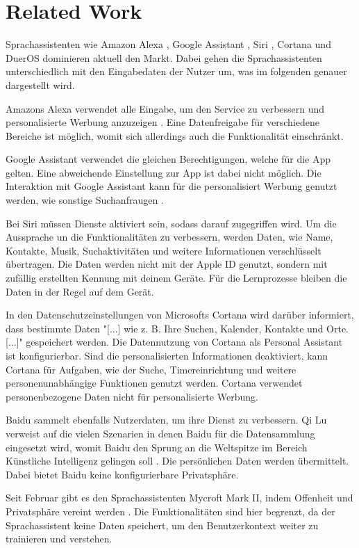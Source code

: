 \section{Related Work}
Sprachassistenten wie Amazon Alexa \cite{alexaAssitent}, Google Assistant \cite{googleAssistant}, Siri \cite{siriAssistent}, Cortana \cite{cortanaAssistent} und DuerOS \cite{baiduAssistant} dominieren aktuell den Markt. Dabei gehen die Sprachassistenten unterschiedlich mit den Eingabedaten der Nutzer um, was im folgenden genauer dargestellt wird. 

Amazons Alexa verwendet alle Eingabe, um den Service zu verbessern und personalisierte Werbung anzuzeigen \cite{alexaPrivacy}. Eine Datenfreigabe für verschiedene Bereiche ist möglich, womit sich allerdings auch die Funktionalität einschränkt. 

Google Assistant verwendet die gleichen Berechtigungen, welche für die App gelten\cite{googleShare}. Eine abweichende Einstellung zur App ist dabei nicht möglich. Die Interaktion mit Google Assistant kann für die personalisiert Werbung genutzt werden, wie sonstige Suchanfraugen \cite{googlePrivacy}. 

Bei Siri müssen Dienste aktiviert sein, sodass darauf zugegriffen wird\cite{siriPrivacy}. Um die Aussprache un die Funktionalitäten zu verbessern, werden Daten, wie Name, Kontakte, Musik, Suchaktivitäten und weitere Informationen verschlüsselt übertragen. Die Daten werden nicht mit der Apple ID genutzt, sondern mit zufällig erstellten Kennung mit deinem Geräte. Für die Lernprozesse bleiben die Daten in der Regel auf dem Gerät.

In den Datenschutzeinstellungen von Microsofts Cortana wird darüber informiert, dass bestimmte Daten "[...] wie z. B. Ihre Suchen, Kalender, Kontakte und Orte. [...]" \cite{cortanaAssistent} gespeichert werden. Die Datennutzung von Cortana als Personal Assistant ist konfigurierbar. Sind die personalisierten Informationen deaktiviert, kann Cortana für Aufgaben, wie der Suche, Timereinrichtung und weitere personenunabhängige Funktionen genutzt werden. Cortana verwendet personenbezogene Daten nicht für personalisierte Werbung.  

Baidu sammelt ebenfalls Nutzerdaten, um ihre Dienst zu verbessern. Qi Lu verweist auf die vielen Szenarien in denen Baidu für die Datensammlung eingesetzt wird, womit Baidu den Sprung an die Weltspitze im Bereich Künstliche Intelligenz gelingen soll \cite{baiduAI}. Die persönlichen Daten werden übermittelt. Dabei bietet Baidu keine konfigurierbare Privatsphäre.

Seit Februar gibt es den Sprachassistenten Mycroft Mark II, indem Offenheit und Privatsphäre vereint werden \cite{mycroftsmartspeaker}. Die Funktionalitäten sind hier begrenzt, da der Sprachassistent keine Daten speichert, um den Benutzerkontext weiter zu trainieren und verstehen.